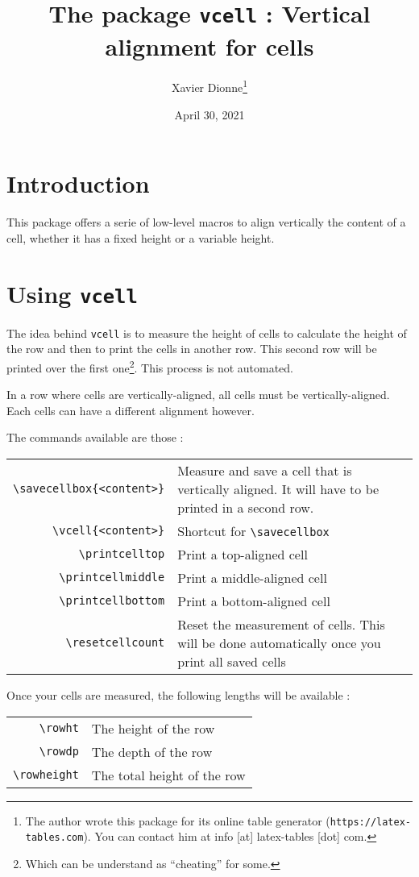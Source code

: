 \documentclass{article}
\begin{document}
\title{The package \texttt{vcell} : Vertical alignment for cells}
\author{Xavier Dionne\thanks{The author wrote this package for its online table generator (\texttt{https://latex-tables.com}). You can contact him at info [at] latex-tables [dot] com.}}
\date{April 30, 2021}
\maketitle

\section{Introduction}

This package offers a serie of low-level macros to align vertically the content of a cell, whether it has a fixed height or a variable height.

\section{Using \texttt{vcell}}

The idea behind \texttt{vcell} is to measure the height of cells to calculate the height of the row and then to print the cells in another row. This second row will be printed over the first one\footnote{Which can be understand as ``cheating'' for some.}. This process is not automated.

In a row where cells are vertically-aligned, all cells must be vertically-aligned. Each cells can have a different alignment however.

The commands available are those :
\begin{center}
\noindent\begin{tabularx}{\textwidth}{rX}
\verb|\savecellbox{<content>}|&Measure and save a cell that is vertically aligned. It will have to be printed in a second row.\\
\verb|\vcell{<content>}|&Shortcut for \verb|\savecellbox|\\
\verb|\printcelltop|&Print a top-aligned cell\\
\verb|\printcellmiddle|&Print a middle-aligned cell\\
\verb|\printcellbottom|&Print a bottom-aligned cell\\
\verb|\resetcellcount|&Reset the measurement of cells. This will be done automatically once you print all saved cells\\
\end{tabularx}
\end{center}
Once your cells are measured, the following lengths will be available :
\begin{center}
\noindent\begin{tabular}{rl}
\verb|\rowht|&The height of the row\\
\verb|\rowdp|&The depth of the row\\
\verb|\rowheight|&The total height of the row\\
\end{tabular}
\end{center}
\end{document}
